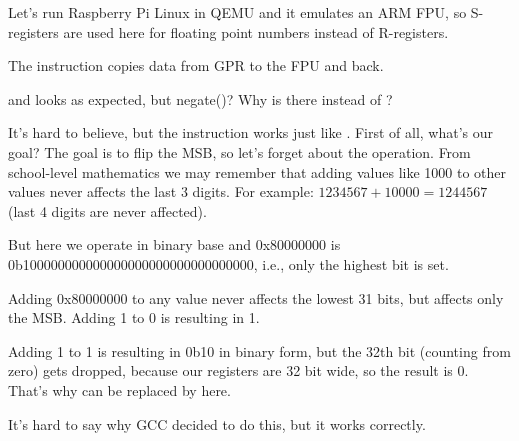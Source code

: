 


Let's run Raspberry Pi Linux in QEMU and it emulates an ARM FPU, so S-registers are used here for floating point
numbers instead of R-registers.


The \FMRS instruction copies data from \ac{GPR} to the FPU and back.

 and  looks as expected, but negate()?
Why is there \ADD instead of \XOR?

It's hard to believe, but the instruction 
 works just like .
First of all, what's our goal?
The goal is to flip the \ac{MSB}, so let's forget about the \XOR operation.
From school-level mathematics we may remember that adding values like 1000 to other values never affects
the last 3 digits.
For example: $1234567 + 10000 = 1244567$ (last 4 digits are never affected).

But here we operate in binary base and 0x80000000 is 0b100000000000000000000000000000000, i.e., only the highest bit is set.

Adding 0x80000000 to any value never affects the lowest 31 bits, but affects only the \ac{MSB}.
Adding 1 to 0 is resulting in 1.

Adding 1 to 1 is resulting in 0b10 in binary form, but the 32th bit (counting from zero) gets dropped, 
because our registers are 32 bit wide, so the result is 0.
That's why \XOR can be replaced by \ADD here.

It's hard to say why GCC decided to do this, but it works correctly.
